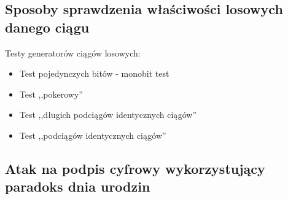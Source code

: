 \documentclass[wi]{zut}
\begin{document}


\subsection{Sposoby sprawdzenia właściwości losowych danego ciągu}

Testy generatorów ciągów losowych:

\begin{itemize}
    \item Test pojedynczych bitów - monobit test
    \item Test ,,pokerowy''
    \item Test ,,długich podciągów identycznych ciągów''
    \item Test ,,podciągów identycznych ciągów''
\end{itemize}




\subsection{Atak na podpis cyfrowy wykorzystujący paradoks dnia urodzin}
\end{document}

